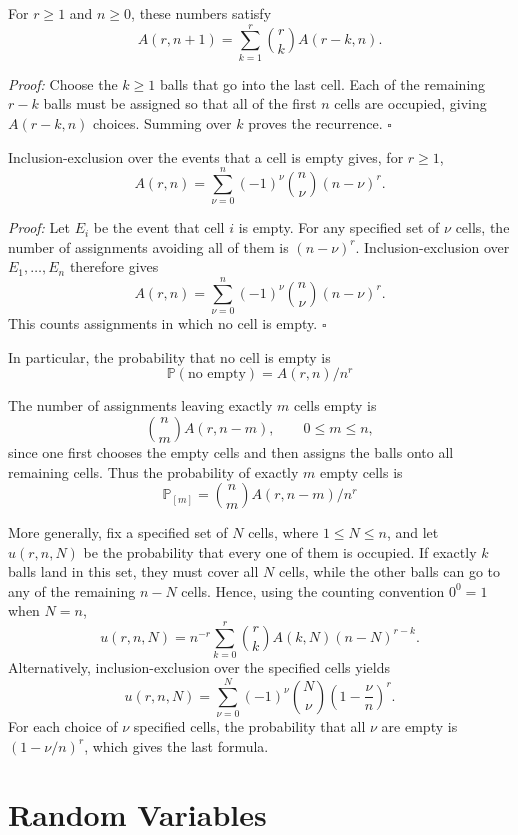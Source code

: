 \documentclass[a4paper,11pt,abstracton]{scrartcl}
\theoremstyle{dotlessP}
\theoremstyle{dotlessS}
\theoremstyle{remark}
\theoremstyle{definition}
\begin{document}
\begin{problem_box}
For $r\geq1$ and $n\geq0$, these numbers satisfy
\[
  A(r,n+1)=\sum_{k=1}^{r}\binom{r}{k}A(r-k,n).
\]
\end{problem_box}

\begin{claim_box}
\textit{Proof:}
Choose the $k\geq1$ balls that go into the last cell. Each of the remaining $r-k$ balls must be assigned so that all of the first $n$ cells are occupied, giving $A(r-k,n)$ choices. Summing over $k$ proves the recurrence.
\hfill$\square$
\end{claim_box}

Inclusion-exclusion over the events that a cell is empty gives, for $r\geq1$,
\[
  A(r,n)=\sum_{\nu=0}^{n}(-1)^\nu\binom{n}{\nu}(n-\nu)^r.
\]
\begin{claim_box}
\textit{Proof:} Let $E_i$ be the event that cell $i$ is empty. For any specified set of $\nu$ cells, the number of assignments avoiding all of them is $(n-\nu)^r$. Inclusion-exclusion over $E_1,\ldots,E_n$ therefore gives
\[
  A(r,n)=\sum_{\nu=0}^{n}(-1)^\nu\binom{n}{\nu}(n-\nu)^r.
\]
This counts assignments in which no cell is empty.
\hfill$\square$
\end{claim_box}
In particular, the probability that no cell is empty is
\[
\mathbb{P}(\text{no empty})=A(r,n)/n^r
\]

The number of assignments leaving exactly $m$ cells empty is
\[
  \binom{n}{m}A(r,n-m),\qquad 0\leq m\leq n,
\]
since one first chooses the empty cells and then assigns the balls onto all remaining cells. Thus the probability of exactly $m$ empty cells is
\[
\mathbb{P}_{[m]}=\binom{n}{m}A(r,n-m)/n^r
\]

More generally, fix a specified set of $N$ cells, where $1\leq N\leq n$, and let $u(r,n,N)$ be the probability that every one of them is occupied. If exactly $k$ balls land in this set, they must cover all $N$ cells, while the other balls can go to any of the remaining $n-N$ cells. Hence, using the counting convention $0^0=1$ when $N=n$,
\[
  u(r,n,N)
  =n^{-r}\sum_{k=0}^{r}\binom{r}{k}A(k,N)(n-N)^{r-k}.
\]
Alternatively, inclusion-exclusion over the specified cells yields
\[
  u(r,n,N)
  =\sum_{\nu=0}^{N}(-1)^\nu\binom{N}{\nu}
    \left(1-\frac{\nu}{n}\right)^r.
\]
For each choice of $\nu$ specified cells, the probability that all $\nu$ are empty is $(1-\nu/n)^r$, which gives the last formula.

\section{Random Variables}
\end{document}
